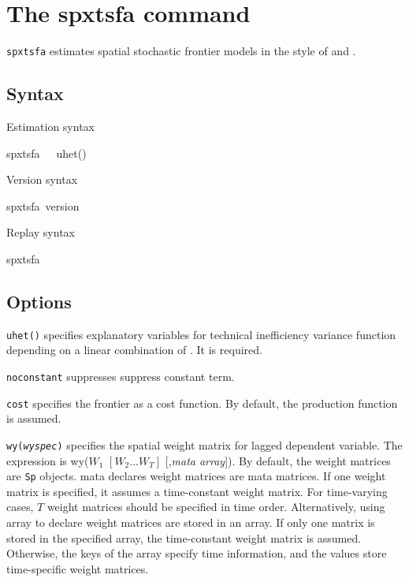 
\section{The spxtsfa command}
{\tt spxtsfa} estimates spatial stochastic frontier models in the style of \cite{orea2019new} and \cite{galli2022spatial}.

\subsection{Syntax}

Estimation syntax

\begin{stsyntax}
	spxtsfa\
    \depvar\
    \optindepvars\,
	uhet(\varlist)
\end{stsyntax}



\noindent Version syntax

\begin{stsyntax}
	spxtsfa\,
	version
\end{stsyntax}


\noindent Replay syntax

\begin{stsyntax}
	spxtsfa\
\end{stsyntax}

\subsection{Options}

\hangpara
{\tt uhet(\varlist)} specifies explanatory variables for technical inefficiency variance  function depending on a linear combination of \varlist. It is required.

\hangpara
{\tt noconstant} suppresses suppress constant term.

\hangpara
{\tt cost} specifies the frontier as a cost function. By default, the production function is assumed.

\hangpara
{\tt wy({\it wyspec})} specifies the spatial weight matrix for lagged dependent variable. The expression is wy($W_1$ $ [W_2 ... W_T]$ [,{\it mata array}]).  By default, the weight matrices are {\tt Sp} objects. mata declares weight matrices are mata matrices. If one weight matrix is specified, it assumes a time-constant weight matrix. For time-varying cases, $T$ weight matrices should be specified in time order. Alternatively, using array to declare weight matrices are stored in an array.  If only one matrix is stored in the specified array, the time-constant weight matrix is assumed.  Otherwise, the keys of the array specify time information, and the values store time-specific weight matrices.

